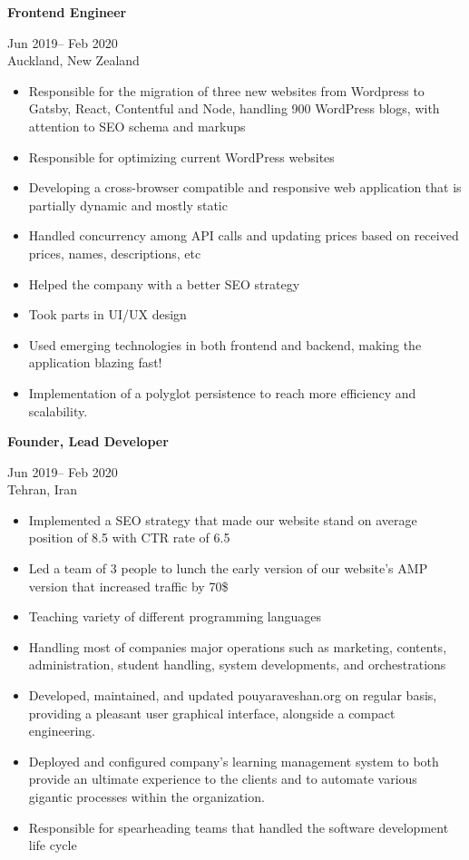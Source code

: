 \documentclass[10pt,a4paper,ragged2e,withhyper]{altacv}
\renewcommand{\cvevent}[4]{%
  \textbf{#1} %
  \hfill %
  \begin{minipage}[t]{.5\linewidth}
    \raggedleft %
    \small#3 %
    \\ %
    #4 %
  \end{minipage}
  \vspace{\baselineskip} %
}
\begin{document}
\divider

\vspace{0.5cm}

\cvevent{Frontend Engineer}{Navigate Travel}{Jun 2019-- Feb 2020}{Auckland, New Zealand}


\begin{itemize}
\item Responsible for the migration of three new websites from Wordpress to Gatsby, React, Contentful and Node, handling 900 WordPress blogs, with attention to SEO schema and markups 
\item Responsible for optimizing current WordPress websites 
\item Developing a cross-browser compatible and responsive web application that is partially dynamic and mostly static
\item Handled concurrency among API calls and updating prices based on received prices, names, descriptions, etc 
\item  Helped the company with a better SEO strategy 
\item Took parts in UI/UX design 
\item Used emerging technologies in both frontend and backend, making the application blazing fast! 
\item Implementation of a polyglot persistence to reach more efficiency and scalability. 
\end{itemize}

\divider

\vspace{0.5cm}

\cvevent{Founder, Lead Developer}{Navigate Travel}{Jun 2019-- Feb 2020}{Tehran, Iran}

\begin{itemize}
\item Implemented a SEO strategy that made our website stand on average position of 8.5 with CTR rate of 6.5
\item Led a team of 3 people to lunch the early version of our website’s AMP version that increased traffic by 70\$
\item Teaching variety of different programming languages
\item Handling most of companies major operations such as
marketing, contents, administration, student handling, system developments, and orchestrations
\item Developed, maintained, and updated pouyaraveshan.org on regular basis, providing a pleasant user graphical interface, alongside a compact engineering.
\item Deployed and configured company's learning management system to both provide an ultimate experience to the clients and to automate various gigantic processes within the organization.
\item Responsible for spearheading teams that handled the software development life cycle 
\end{itemize}
\end{document}
